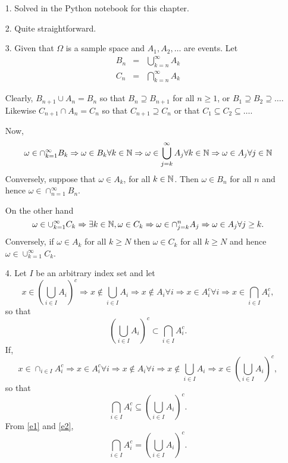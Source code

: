 \documentclass{article}
\begin{document}
\begin{enumerate}
\item[1.] Solved in the Python notebook for this chapter.

\item[2.] Quite straightforward.

\item[3.] Given that $\Omega$ is a sample space and $A_1, A_2, \ldots$ are
events. Let
\begin{eqnarray*}
B_n &=& \bigcup_{k=n}^\infty A_k \\
C_n &=& \bigcap_{k=n}^\infty A_k
\end{eqnarray*}

Clearly, $B_{n+1} \cup A_{n} = B_{n}$ so that $B_n \supseteq B_{n+1}$ for all $n
\ge 1$, or $B_1 \supseteq B_2 \supseteq \ldots$. Likewise $C_{n+1} \cap A_{n} = 
C_n$ so that $C_{n+1} \supseteq C_n$ or that $C_1 \subseteq C_2 \subseteq \ldots$.

Now,
\[
\omega \in \cap_{k=1}^\infty B_k \Rightarrow \omega \in B_k \forall k \in \mathbb{N}
\Rightarrow \omega \in \bigcup_{j=k}^\infty A_j \forall k \in \mathbb{N} \Rightarrow
\omega \in A_j \forall j \in \mathbb{N}
\]
Conversely, suppose that $\omega \in A_k$, for all $k \in \mathbb{N}$. Then $\omega \in
B_n$ for all $n$ and hence $\omega \in \cap_{n=1}^\infty B_n$.

On the other hand
\[
\omega \in \cup_{k=1}^\infty C_k \Rightarrow \exists k \in \mathbb{N}, \omega \in C_k
\Rightarrow \omega \in \cap_{j=k}^n A_j \Rightarrow \omega \in A_j \forall j
\ge k.
\]
Conversely, if $\omega \in A_k$ for all $k \ge N$ then $\omega \in C_k$ for all
$k \ge N$ and hence $\omega \in \cup_{k=1}^\infty C_k$.

\item[4.] Let $I$ be an arbitrary index set and let
\[
x \in \left(\bigcup_{i \in I}A_i\right)^c \Rightarrow x \notin \bigcup_{i \in I}A_i
\Rightarrow x \notin A_i \forall i \Rightarrow x \in A_i^c \forall i \Rightarrow 
x \in \bigcap_{i\in I}A_i^c,
\]
so that
\begin{equation}\label{e1}
\left(\bigcup_{i \in I}A_i\right)^c \subset \bigcap_{i\in I}A_i^c.
\end{equation}
If,
\[
x \in \cap_{i\in I}A_i^c \Rightarrow x \in A_i^c \forall i \Rightarrow
x \notin A_i \forall i \Rightarrow x \notin \bigcup_{i \in I}A_i
\Rightarrow x \in \left(\bigcup_{i \in I}A_i\right)^c,
\]
so that
\begin{equation}\label{e2}
\bigcap_{i\in I}A_i^c \subseteq \left(\bigcup_{i \in I}A_i\right)^c.
\end{equation}
From \eqref{e1} and \eqref{e2},
\[
\bigcap_{i\in I}A_i^c = \left(\bigcup_{i \in I}A_i\right)^c.
\]


\end{enumerate}
\end{document}

